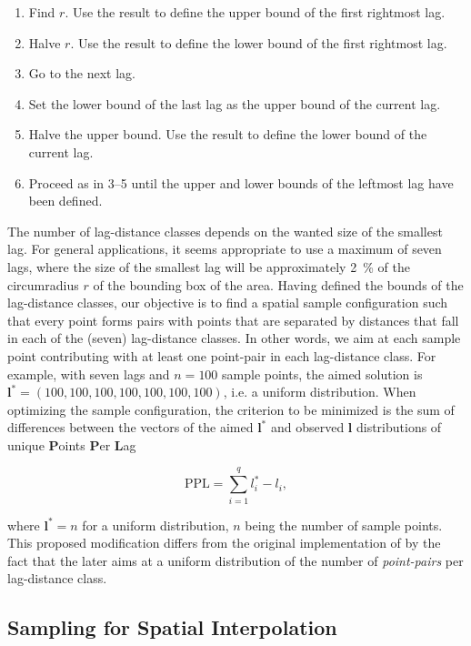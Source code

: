 \begin{enumerate}
 \item Find $r$. Use the result to define the upper bound of the first rightmost lag.
 \item Halve $r$. Use the result to define the lower bound of the first rightmost lag.
 \item Go to the next lag.
 \item Set the lower bound of the last lag as the upper bound of the current lag.
 \item Halve the upper bound. Use the result to define the lower bound of the current lag.
 \item Proceed as in 3--5 until the upper and lower bounds of the leftmost lag have been defined.
\end{enumerate}

\noindent The number of lag-distance classes depends on the wanted size of the smallest lag. For general 
applications, it seems appropriate to use a maximum of seven lags, where the size of the smallest lag will be 
approximately \SI{2}{\percent} of the circumradius $r$ of the bounding box of the area. Having defined the 
bounds of the lag-distance classes, our objective is to find a spatial sample configuration such that every 
point forms pairs with points that are separated by distances that fall in each of the (seven) lag-distance 
classes. In other words, we aim at each sample point contributing with at least one point-pair in each 
lag-distance class. For example, with seven lags and $n = 100$ sample points, the aimed solution is 
$\boldsymbol{l}^* = (100, 100, 100, 100, 100, 100, 100)$, i.e. a uniform distribution. When optimizing the 
sample configuration, the criterion to be minimized is the sum of differences between the vectors of the aimed 
$\boldsymbol{l}^*$ and observed $\boldsymbol{l}$ distributions of unique \textbf{P}oints \textbf{P}er 
\textbf{L}ag

\begin{equation} %
 \text{PPL} = \sum_{i = 1}^{q} l_i^* - l_i,
\end{equation}\label{eqn:chap08-ppl}

\noindent where $\boldsymbol{l}^* = n$ for a uniform distribution, $n$ being the number of sample points. This 
proposed modification differs from the original implementation of \citet{WarrickEtAl1987} by the fact that the 
later aims at a uniform distribution of the number of \emph{point-pairs} per lag-distance class.

\subsection{Sampling for Spatial Interpolation}


